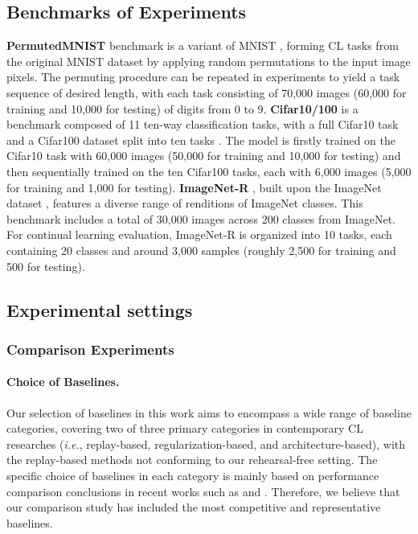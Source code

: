 \subsection{Benchmarks of Experiments}
\label{sec:benchmark}
\textbf{PermutedMNIST} \citep{goodfellow2013empirical} benchmark is a variant of MNIST \citep{lecun1998gradient}, forming CL tasks from the original MNIST dataset by applying random permutations to the input image pixels.
The permuting procedure can be repeated in experiments to yield a task sequence of desired length, with each task consisting of 70,000 images (60,000 for training and 10,000 for testing) of digits from 0 to 9.
\textbf{Cifar10/100} is a benchmark composed of 11 ten-way classification tasks, with a full Cifar10 task and a Cifar100 dataset split into ten tasks \citep{krizhevsky2009learning}. The model is firstly trained on the Cifar10 task with 60,000 images (50,000 for training and 10,000 for testing) and then sequentially trained on the ten Cifar100 tasks, each with 6,000 images (5,000 for training and 1,000 for testing). \textbf{ImageNet-R} \citep{hendrycks2021many}, built upon the ImageNet dataset \citep{deng2009imagenet}, features a diverse range of renditions of ImageNet classes. This benchmark includes a total of 30,000 images across 200 classes from ImageNet. For continual learning evaluation, ImageNet-R is organized into 10 tasks, each containing 20 classes and around 3,000 samples (roughly 2,500 for training and 500 for testing).

\subsection{Experimental settings}
\label{sec:Aset}


\subsubsection{Comparison Experiments}

\paragraph{Choice of Baselines.} Our selection of baselines in this work aims to encompass a wide range of baseline categories, covering two of three primary categories in contemporary CL researches (\textit{i.e.}, replay-based, regularization-based, and architecture-based), with the replay-based methods not conforming to our rehearsal-free setting. The specific choice of baselines in each category is mainly based on performance comparison conclusions in recent works such as \cite{smith2023closer} and \cite{kang2022forget}. Therefore, we believe that our comparison study has included the most competitive and representative baselines.

